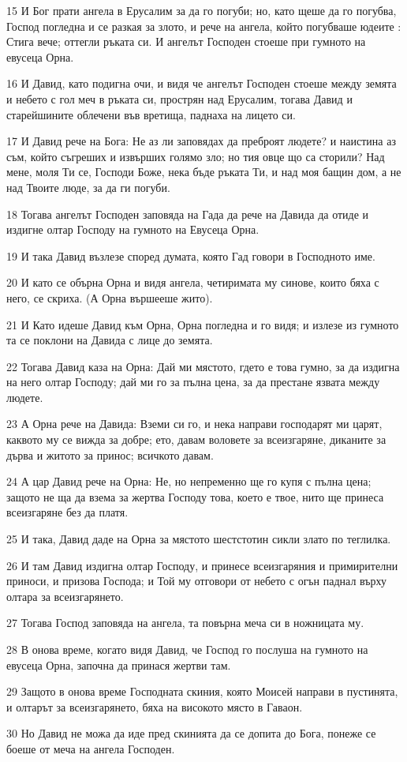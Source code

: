 \par 15 И Бог прати ангела в Ерусалим за да го погуби; но, като щеше да го погубва, Господ погледна и се разкая за злото, и рече на ангела, който погубваше юдеите : Стига вече; оттегли ръката си. И ангелът Господен стоеше при гумното на евусеца Орна.
\par 16 И Давид, като подигна очи, и видя че ангелът Господен стоеше между земята и небето с гол меч в ръката си, прострян над Ерусалим, тогава Давид и старейшините облечени във вретища, паднаха на лицето си.
\par 17 И Давид рече на Бога: Не аз ли заповядах да преброят людете? и наистина аз съм, който съгреших и извърших голямо зло; но тия овце що са сторили? Над мене, моля Ти се, Господи Боже, нека бъде ръката Ти, и над моя бащин дом, а не над Твоите люде, за да ги погуби.
\par 18 Тогава ангелът Господен заповяда на Гада да рече на Давида да отиде и издигне олтар Господу на гумното на Евусеца Орна.
\par 19 И така Давид възлезе според думата, която Гад говори в Господното име.
\par 20 И като се обърна Орна и видя ангела, четиримата му синове, които бяха с него, се скриха. (А Орна вършееше жито).
\par 21 И Като идеше Давид към Орна, Орна погледна и го видя; и излезе из гумното та се поклони на Давида с лице до земята.
\par 22 Тогава Давид каза на Орна: Дай ми мястото, гдето е това гумно, за да издигна на него олтар Господу; дай ми го за пълна цена, за да престане язвата между людете.
\par 23 А Орна рече на Давида: Вземи си го, и нека направи господарят ми царят, каквото му се вижда за добре; ето, давам воловете за всеизгаряне, диканите за дърва и житото за принос; всичкото давам.
\par 24 А цар Давид рече на Орна: Не, но непременно ще го купя с пълна цена; защото не ща да взема за жертва Господу това, което е твое, нито ще принеса всеизгаряне без да платя.
\par 25 И така, Давид даде на Орна за мястото шестстотин сикли злато по теглилка.
\par 26 И там Давид издигна олтар Господу, и принесе всеизгаряния и примирителни приноси, и призова Господа; и Той му отговори от небето с огън паднал върху олтара за всеизгарянето.
\par 27 Тогава Господ заповяда на ангела, та повърна меча си в ножницата му.
\par 28 В онова време, когато видя Давид, че Господ го послуша на гумното на евусеца Орна, започна да принася жертви там.
\par 29 Защото в онова време Господната скиния, която Моисей направи в пустинята, и олтарът за всеизгарянето, бяха на високото място в Гаваон.
\par 30 Но Давид не можа да иде пред скинията да се допита до Бога, понеже се боеше от меча на ангела Господен.

